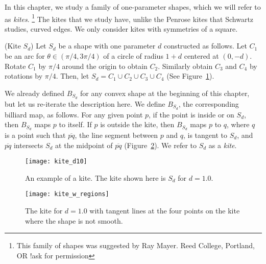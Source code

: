 \documentclass[12pt,twoside,draft]{book}
\begin{document}
In this chapter, we study a family of one-parameter shapes, which we will refer to as \textit{kites}.
\footnote{This family of shapes was suggested by Ray Mayer. Reed College, Portland, OR !ask for permission}
The kites that we study have, unlike the Penrose kites that Schwartz studies, curved edges.
We only consider kites with symmetries of a square.
\begin{definition}
  (Kite $S_d$)
  Let $S_d$ be a shape with one parameter $d$ constructed as follows.
  Let $C_1$ be an arc for $\theta \in (\pi/4, 3\pi/4)$ of a circle of radius $1+d$ centered at $(0,-d)$.
  Rotate $C_1$ by $\pi/4$ around the origin to obtain $C_2$.
  Similarly obtain $C_3$ and $C_4$ by rotations by $\pi/4$.
  Then, let $S_d = C_1 \cup C_2 \cup C_3 \cup C_4$ (See Figure~\ref{fig:kiteeg}).

  We already defined $B_{S_d}$ for any convex shape at the beginning of this chapter, but let us re-iterate the description here.
  We define $B_{S_d}$, the corresponding billiard map, as follows.
  For any given point $p$, if the point is inside or on $S_d$, then $B_{S_d}$ maps $p$ to itself.
  If $p$ is outside the kite, then $B_{S_d}$ maps $p$ to $q$, where $q$ is a point such that $\overline{pq}$, the line segment between $p$ and $q$, is tangent to $S_d$, and $\overline{pq}$ intersects $S_d$ at the midpoint of $\overline{pq}$ (Figure~\ref{fig:kite-regions}).
  We refer to $S_d$ as a \textit{kite}.

\end{definition}
\begin{figure}[ht]
  \begin{center}
    \texttt{[image: kite\_d10]}
    \caption{An example of a kite. The kite shown here is $S_d$ for $d = 1.0$.}
    \label{fig:kiteeg}
  \end{center}
\end{figure}
\begin{figure}[ht]
  \begin{center}
    \texttt{[image: kite\_w\_regions]}
    \caption{The kite for $d = 1.0$ with tangent lines at the four points on the kite where the shape is not smooth.}
    \label{fig:kite-regions}
  \end{center}
\end{figure}
\end{document}
